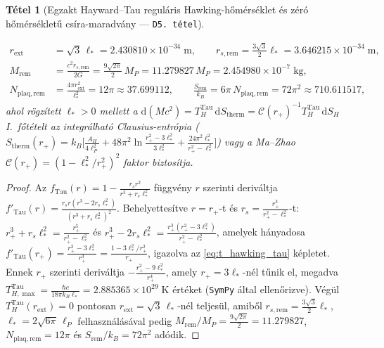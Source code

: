 \documentclass[11pt,a4paper]{article}
\newtheorem{theorem}{T\'etel}[section]
\theoremstyle{remark}
\begin{document}
\begin{theorem}[Egzakt Hayward--Tau regul\'aris Hawking-h\H{o}m\'ers\'eklet \'es z\'er\'o h\H{o}m\'ers\'eklet\H{u} cs\'ira-maradv\'any --- \texttt{D5.\ t\'etel}]
\begin{enumerate}
  \begin{align}
    r_{\mathrm{ext}} &= \sqrt{3}\,\ell_* = 2.430810 \times 10^{-34}\;\mathrm{m}, \qquad
    r_{s,\mathrm{rem}} = \frac{3\sqrt{3}}{2}\ell_* = 3.646215 \times 10^{-34}\;\mathrm{m}, \nonumber\\
    M_{\mathrm{rem}} &= \frac{c^2 r_{s,\mathrm{rem}}}{2G} = \frac{9\sqrt{2\pi}}{2}\,M_P = 11.279827\,M_P = 2.454980 \times 10^{-7}\;\mathrm{kg}, \nonumber\\
    N_{\mathrm{plaq,rem}} &= \frac{4\pi r_{\mathrm{ext}}^2}{\ell_*^2} = 12\pi \approx 37.699112, \qquad
    \frac{S_{\mathrm{rem}}}{k_B} = 6\pi\,N_{\mathrm{plaq,rem}} = 72\pi^2 \approx 710.611517,
    \label{eq:extremal_remnant}
  \end{align}
  ahol r\"ogz\'itett $\ell_* > 0$ mellett a $\mathrm{d}(Mc^2) = T_H^{\mathrm{Tau}}\,\mathrm{d}S_{\mathrm{therm}} = \mathcal{C}(r_+)^{-1}T_H^{\mathrm{Tau}}\,\mathrm{d}S_H$ I.\ f\H{o}t\'etelt az integr\'alhat\'o Clausius-entr\'opia ($S_{\mathrm{therm}}(r_+) = k_B\bigl[\frac{A_H}{4\ell_P^2} + 48\pi^2\ln\frac{r_+^2-3\ell_*^2}{3\ell_*^2} + \frac{24\pi^2\ell_*^2}{r_+^2-\ell_*^2}\bigr]$) vagy a Ma--Zhao $\mathcal{C}(r_+) = (1-\ell_*^2/r_+^2)^2$ faktor biztos\'itja.
\end{enumerate}
\end{theorem}

\begin{proof}
Az $f_{\mathrm{Tau}}(r) = 1 - \frac{r_s r^2}{r^3 + r_s\ell_*^2}$ f\"uggv\'eny $r$ szerinti deriv\'altja $f'_{\mathrm{Tau}}(r) = \frac{r_s r(r^3 - 2r_s\ell_*^2)}{(r^3 + r_s\ell_*^2)^2}$. Behelyettes\'itve $r = r_+$-t \'es $r_s = \frac{r_+^3}{r_+^2 - \ell_*^2}$-t: $r_+^3 + r_s\ell_*^2 = \frac{r_+^5}{r_+^2 - \ell_*^2}$ \'es $r_+^3 - 2r_s\ell_*^2 = \frac{r_+^3(r_+^2 - 3\ell_*^2)}{r_+^2 - \ell_*^2}$, amelyek h\'anyadosa $f'_{\mathrm{Tau}}(r_+) = \frac{r_+^2 - 3\ell_*^2}{r_+^3} = \frac{1 - 3\ell_*^2/r_+^2}{r_+}$, igazolva az \eqref{eq:t_hawking_tau} k\'epletet. Ennek $r_+$ szerinti deriv\'altja $-\frac{r_+^2 - 9\ell_*^2}{r_+^4}$, amely $r_+ = 3\ell_*$-n\'el t\H{u}nik el, megadva $T_{H,\max}^{\mathrm{Tau}} = \frac{\hbar c}{18\pi k_B\ell_*} = 2.885365 \times 10^{29}\;\mathrm{K}$ \'ert\'eket (\texttt{SymPy} \'altal ellen\H{o}rizve). V\'eg\"ul $T_H^{\mathrm{Tau}}(r_{\mathrm{ext}}) = 0$ pontosan $r_{\mathrm{ext}} = \sqrt{3}\,\ell_*$-n\'el teljes\"ul, amib\H{o}l $r_{s,\mathrm{rem}} = \frac{3\sqrt{3}}{2}\ell_*$, $\ell_* = 2\sqrt{6\pi}\,\ell_P$ felhaszn\'al\'as\'aval pedig $M_{\mathrm{rem}}/M_P = \frac{9\sqrt{2\pi}}{2} = 11.279827$, $N_{\mathrm{plaq,rem}} = 12\pi$ \'es $S_{\mathrm{rem}}/k_B = 72\pi^2$ ad\'odik.
\end{proof}
\end{document}
